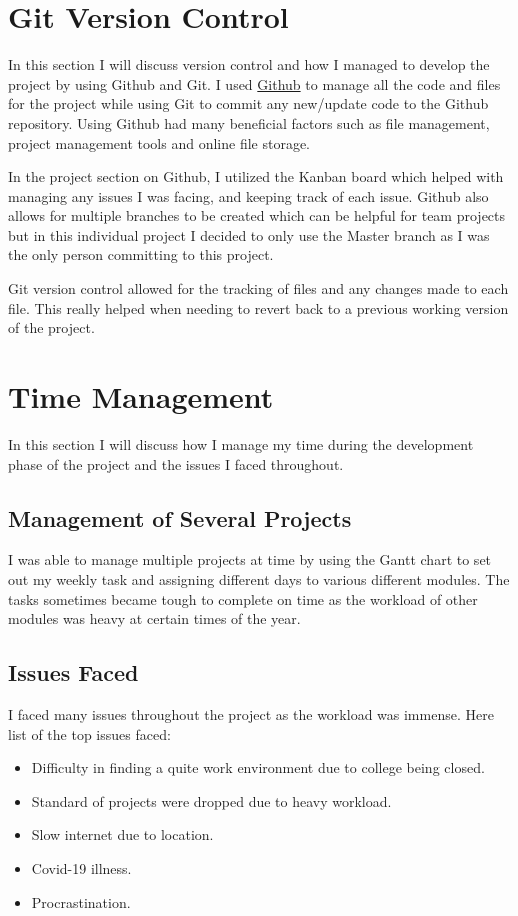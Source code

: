 \section{Git Version Control}
In this section I will discuss version control and how I managed to develop the project by using Github and Git. I used \href{https://github.com/MarkReillyGMIT/AppliedProject}{Github} to manage all the code and files for the project while using Git to commit any new/update code to the Github repository. Using Github had many beneficial factors such as file management, project management tools and online file storage. 

In the project section on Github, I utilized the Kanban board which helped with managing any issues I was facing, and keeping track of each issue. Github also allows for multiple branches to be created which can be helpful for team projects but in this individual project I decided to only use the Master branch as I was the only person committing to this project.

Git version control allowed for the tracking of files and any changes made to each file. This really helped when needing to revert back to a previous working version of the project. 

\section{Time Management}
In this section I will discuss how I manage my time during the development phase of the project and the issues I faced throughout.

\subsection{Management of Several Projects}
I was able to manage multiple projects at time by using the Gantt chart to set out my weekly task and assigning different days to various different modules. The tasks sometimes became tough to complete on time as the workload of other modules was heavy at certain times of the year. 

\subsection{Issues Faced}
I faced many issues throughout the project as the workload was immense. Here list of the top issues faced:

\begin{itemize}
    \item Difficulty in finding a quite work environment due to college being closed.
    \item Standard of projects were dropped due to heavy workload.
    \item Slow internet due to location.
    \item Covid-19 illness.
    \item Procrastination. 
\end{itemize}
\newpage


